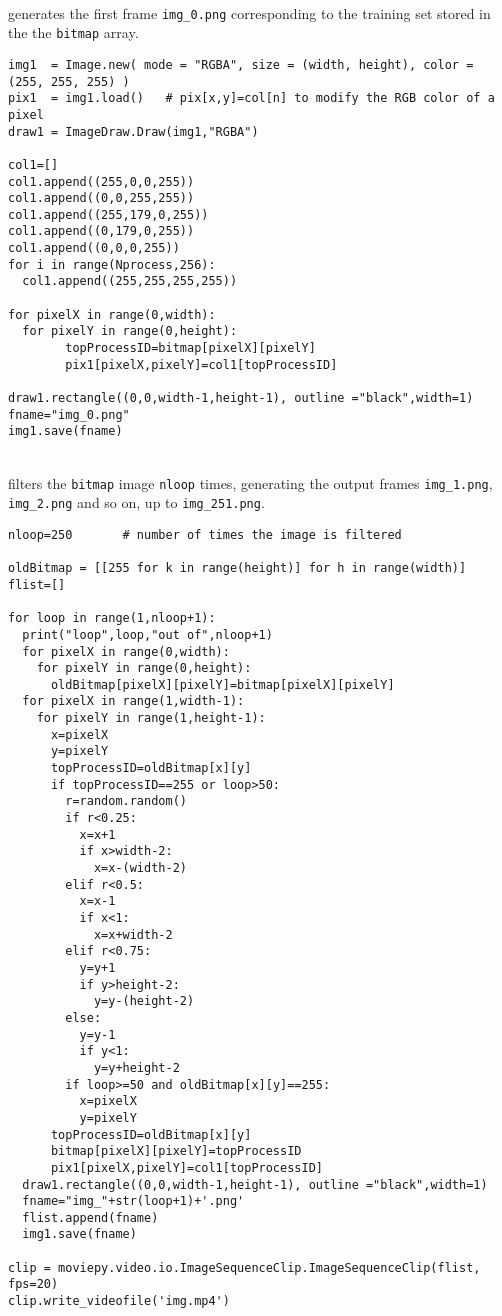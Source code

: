 \documentclass[10pt]{article}
\begin{document}
\quad \\
 generates the first frame \texttt{img\_0.png} corresponding to the training set stored in the the \texttt{bitmap} array.
\begin{lstlisting}
img1  = Image.new( mode = "RGBA", size = (width, height), color = (255, 255, 255) )
pix1  = img1.load()   # pix[x,y]=col[n] to modify the RGB color of a pixel
draw1 = ImageDraw.Draw(img1,"RGBA")

col1=[] 
col1.append((255,0,0,255))
col1.append((0,0,255,255))
col1.append((255,179,0,255))
col1.append((0,179,0,255))
col1.append((0,0,0,255))
for i in range(Nprocess,256):
  col1.append((255,255,255,255))
 
for pixelX in range(0,width): 
  for pixelY in range(0,height): 
        topProcessID=bitmap[pixelX][pixelY]
        pix1[pixelX,pixelY]=col1[topProcessID]

draw1.rectangle((0,0,width-1,height-1), outline ="black",width=1)
fname="img_0.png"
img1.save(fname)
\end{lstlisting}
\quad \\
 filters the \texttt{bitmap} image \texttt{nloop} times, generating the output frames \texttt{img\_1.png}, \texttt{img\_2.png} and so on, up to \texttt{img\_251.png}.
\begin{lstlisting}
nloop=250       # number of times the image is filtered 

oldBitmap = [[255 for k in range(height)] for h in range(width)]
flist=[]

for loop in range(1,nloop+1): 
  print("loop",loop,"out of",nloop+1) 
  for pixelX in range(0,width): 
    for pixelY in range(0,height): 
      oldBitmap[pixelX][pixelY]=bitmap[pixelX][pixelY]
  for pixelX in range(1,width-1): 
    for pixelY in range(1,height-1):   
      x=pixelX
      y=pixelY
      topProcessID=oldBitmap[x][y]
      if topProcessID==255 or loop>50: 
        r=random.random()
        if r<0.25: 
          x=x+1 
          if x>width-2: 
            x=x-(width-2)
        elif r<0.5:
          x=x-1 
          if x<1: 
            x=x+width-2
        elif r<0.75:
          y=y+1 
          if y>height-2: 
            y=y-(height-2)
        else:
          y=y-1 
          if y<1: 
            y=y+height-2         
        if loop>=50 and oldBitmap[x][y]==255:
          x=pixelX
          y=pixelY
      topProcessID=oldBitmap[x][y]  
      bitmap[pixelX][pixelY]=topProcessID
      pix1[pixelX,pixelY]=col1[topProcessID]
  draw1.rectangle((0,0,width-1,height-1), outline ="black",width=1)
  fname="img_"+str(loop+1)+'.png'
  flist.append(fname)   
  img1.save(fname)

clip = moviepy.video.io.ImageSequenceClip.ImageSequenceClip(flist, fps=20) 
clip.write_videofile('img.mp4')
\end{lstlisting}
\end{document}
